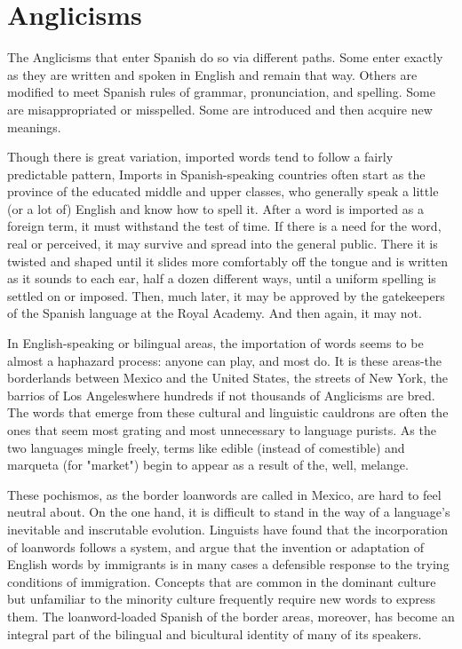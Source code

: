 \documentclass[14pt,a4paper,oneside]{memoir}
\begin{document}
{{{{\section{Anglicisms}

The Anglicisms that enter Spanish do so via different paths.
Some enter exactly as they are written and spoken in English and remain that way. Others are modified to meet Spanish rules of grammar,
pronunciation, and spelling. Some are misappropriated or misspelled.
Some are introduced and then acquire new meanings.

Though there is great variation, imported words tend to follow
a fairly predictable pattern, Imports in Spanish-speaking countries often start as the province of the educated middle and upper classes, who
generally speak a little (or a lot of) English and know how to spell it.
After a word is imported as a foreign term, it must withstand the test
of time. If there is a need for the word, real or perceived, it may survive
and spread into the general public. There it is twisted and shaped until
it slides more comfortably off the tongue and is written as it sounds to
each ear, half a dozen different ways, until a uniform spelling is settled
on or imposed. Then, much later, it may be approved by the gatekeepers of the Spanish language at the Royal Academy. And then again, it
may not.

In English-speaking or bilingual areas, the importation of
words seems to be almost a haphazard process: anyone can play, and
most do. It is these areas-the borderlands between Mexico and the
United States, the streets of New York, the barrios of Los Angeleswhere hundreds if not thousands of Anglicisms are bred. The words
that emerge from these cultural and linguistic cauldrons are often the
ones that seem most grating and most unnecessary to language purists.
As the two languages mingle freely, terms like edible (instead of comestible) and marqueta (for "market") begin to appear as a result of
the, well, melange.

These pochismos, as the border loanwords are called in
Mexico, are hard to feel neutral about. On the one hand, it is difficult to
stand in the way of a language's inevitable and inscrutable evolution.
Linguists have found that the incorporation of loanwords follows a system, and argue that the invention or adaptation of English words by
immigrants is in many cases a defensible response to the trying conditions of immigration. Concepts that are common in the dominant culture but unfamiliar to the minority culture frequently require new
words to express them. The loanword-loaded Spanish of the border
areas, moreover, has become an integral part of the bilingual and bicultural identity of many of its speakers.

}}}}
\end{document}
